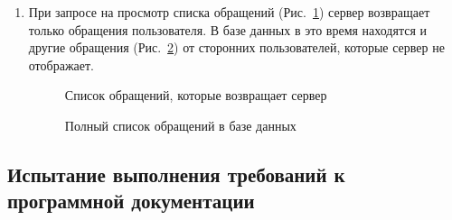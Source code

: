 \documentclass{../includes/TechDoc}
\begin{document}
\begin{enumerate}
        \item При запросе на просмотр списка обращений (Рис.~\ref{ris:api_problem_list}) сервер возвращает только обращения пользователя.
        В базе данных в это время находятся и другие обращения (Рис.~\ref{ris:api_full_problem_list}) от сторонних пользователей, которые сервер не отображает.
        \begin{figure}[ht]
            \centering
            \caption{Список обращений, которые возвращает сервер}
            \label{ris:api_problem_list}
        \end{figure}
        \begin{figure}[ht]
            \centering
            \caption{Полный список обращений в базе данных}
            \label{ris:api_full_problem_list}
        \end{figure}
    \end{enumerate}

    \subsection{Испытание выполнения требований к программной документации}
\end{document}
